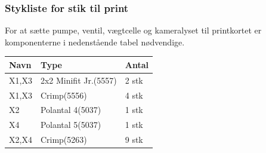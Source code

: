 \subsubsection{Stykliste for stik til print}
For at sætte pumpe, ventil, vægtcelle og kameralyset til printkortet er komponenterne i nedenstående tabel nødvendige. 
\begin{center}
		\begin{longtable}{ | m{6cm} | m{4cm}| m{2cm}| } 
			\hline
			\textbf{Navn} &\textbf{Type} & \textbf{Antal} \\ 
			\hline
			X1,X3 & 2x2 Minifit Jr.(5557) & 2 stk \\ 
			\hline
			X1,X3 & Crimp(5556) & 4 stk \\ 
			\hline
			X2 & Polantal 4(5037) & 1 stk \\ 
			\hline
			X4 & Polantal 5(5037) & 1 stk \\ 
			\hline
			X2,X4 & Crimp(5263) & 9 stk \\ 
			\hline
		\end{longtable}
\end{center}

 